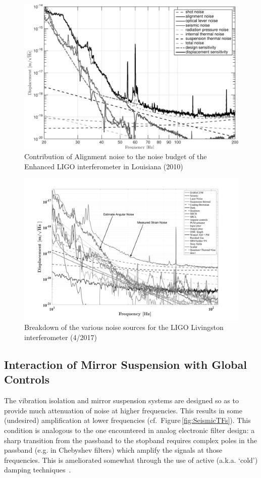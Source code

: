 \begin{figure}[h]
  \centering
    \includegraphics[width=\columnwidth]{Figures/S6_NB-BW.pdf}
    \caption{Contribution of Alignment noise to the noise budget of the
    Enhanced LIGO interferometer in Louisiana (2010)}
    \label{fig:eLIGO}
\end{figure}

\begin{figure}[h]
    \includegraphics[width=\columnwidth]{Figures/L1-NB-BW.pdf}
    \caption{Breakdown of the various noise sources for the LIGO Livingston interferometer (4/2017)}
    \label{fig:aLIGO}
\end{figure}


\subsection{Interaction of Mirror Suspension with Global Controls}
The vibration isolation and mirror suspension systems are designed so as to
provide much attenuation of noise at higher frequencies.  This results in some (undesired) amplification at lower frequencies (cf.~Figure\,\ref{fig:SeismicTFs}). This condition is analogous to the
one encountered in analog electronic filter design: a sharp transition from
the passband to the stopband requires complex poles in the passband (e.g.
in Chebyshev filters) which amplify the signals at those frequencies. This
is ameliorated somewhat through the use of active (a.k.a. `cold') damping
techniques~\cite{Kuroda:1982vf, Forward:1979ks, Shapiro:2015di}.


